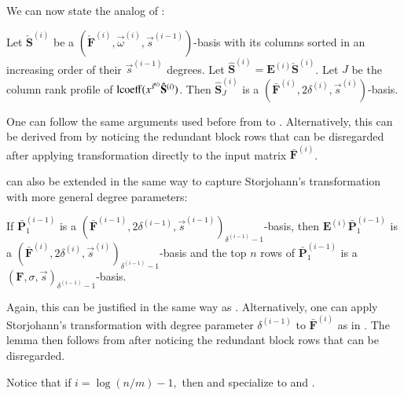 We can now state the analog of : 
\begin{thm}
\label{thm:extractingOrderBasis}Let $\check{\mathbf{S}}^{\left(i\right)}$
be a $(\check{\mathbf{F}}^{\left(i\right)},\vec{\omega}^{\left(i\right)},\vec{s}^{\left(i-1\right)})$-basis
with its columns sorted in an increasing order of their $\vec{s}^{\left(i-1\right)}$
degrees. Let $\hat{\mathbf{S}}^{\left(i\right)}=\mathbf{E}^{\left(i\right)}\check{\mathbf{S}}^{\left(i\right)}$.
Let $J$ be the column rank profile of $\operatorname{lcoeff}(x^{\vec{s}^{\left(i\right)}}\hat{\mathbf{S}}^{\left(i\right)})$.
Then $\hat{\mathbf{S}}_{J}^{\left(i\right)}$ is a $(\bar{\mathbf{F}}^{\left(i\right)},2\delta^{\left(i\right)},\vec{s}^{\left(i\right)})$-basis.\end{thm}
\begin{pf}
One can follow the same arguments used before from 
to . Alternatively, this
can be derived from  by
noticing the redundant block rows that can be disregarded after applying
transformation  directly to the
input matrix $\bar{\mathbf{F}}^{\left(i\right)}$. 
\end{pf}
 can also be extended in the same way
to capture Storjohann's transformation with more general degree parameters: 
\begin{lem}
\label{lem:linkStorjohanTransform}If $\bar{\mathbf{P}}_{1}^{\left(i-1\right)}$
is a $(\bar{\mathbf{F}}^{\left(i-1\right)},2\delta^{\left(i-1\right)},\vec{s}^{\left(i-1\right)})_{\delta^{\left(i-1\right)}-1}$-basis,
then $\mathbf{E}^{\left(i\right)}\bar{\mathbf{P}}_{1}^{\left(i-1\right)}$
is a $(\bar{\mathbf{F}}^{\left(i\right)},2\delta^{\left(i\right)},\vec{s}^{\left(i\right)})_{\delta^{\left(i-1\right)}-1}$-basis
and the top $n$ rows of $\bar{\mathbf{P}}_{1}^{\left(i-1\right)}$
is a $(\mathbf{F},\sigma,\vec{s})_{\delta^{\left(i-1\right)}-1}$-basis.\end{lem}
\begin{pf}
Again, this can be justified in the same way as .
Alternatively, one can apply Storjohann's transformation with degree
parameter $\delta^{\left(i-1\right)}$ to $\bar{\mathbf{F}}^{\left(i\right)}$
as in . The lemma then
follows from  after noticing the redundant
block rows that can be disregarded. 
\end{pf}
Notice that if $i=\log\left(n/m\right)-1,$ then 
and  specialize to 
and . 
